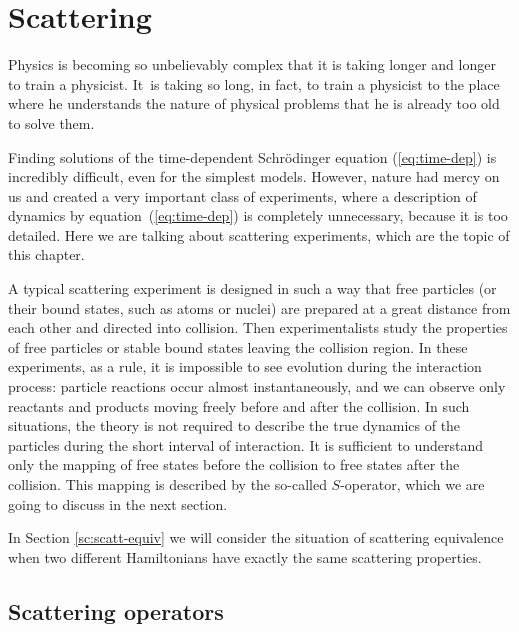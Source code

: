 \documentclass[]{stefan1}
\begin{document}
\chapter{Scattering}\label{sc:scattering}
\begin{epigraph}
{Physics is becoming so unbelievably complex that it is taking
longer and longer to train a physicist. It~is taking so long, in fact,
to train a physicist to the place where he understands the nature of
physical problems that he is already too old to solve them. }
\author{Eugene P. Wigner}
\end{epigraph}
%
Finding solutions of the time-dependent Schr\"{o}dinger equation
(\ref{eq:time-dep}) is incredibly difficult, even for the simplest
models. However, nature had mercy on us and created a very important
class of experiments, where a description of dynamics by
equation~(\ref{eq:time-dep}) is completely unnecessary, because it is
too detailed. Here we are talking about scattering experiments, which
are the topic of this chapter.

A typical scattering experiment is designed in such a way that free
particles (or their bound states, such as atoms or nuclei) are prepared
at a great distance from each other and directed into collision. Then
experimentalists study the properties of free particles or stable bound
states leaving the collision region. In these experiments, as a rule,
it is impossible to see evolution during the interaction process:
particle reactions occur almost instantaneously, and we can observe only
reactants and products moving freely before and after the collision. In
such situations, the theory is not required to describe the true
dynamics of the particles during the short interval of interaction. It
is sufficient to understand only the mapping of free states before the
collision to free states after the collision. This mapping is described
by the so-called $ S $-operator, which we are going to discuss in the
next section.

In Section \ref{sc:scatt-equiv} we will consider the situation of
scattering equivalence when two different Hamiltonians have exactly the
same scattering properties.

\section{Scattering operators}\label{ss:scattering}

\end{document}
